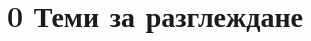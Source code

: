 \documentclass{article}
\begin{document}
	\newpage
	\date{}
	\maketitle

	
	\tableofcontents
		

	\section* {0 \hspace{0.4cm}Теми за разглеждане}
	
\end{document}
